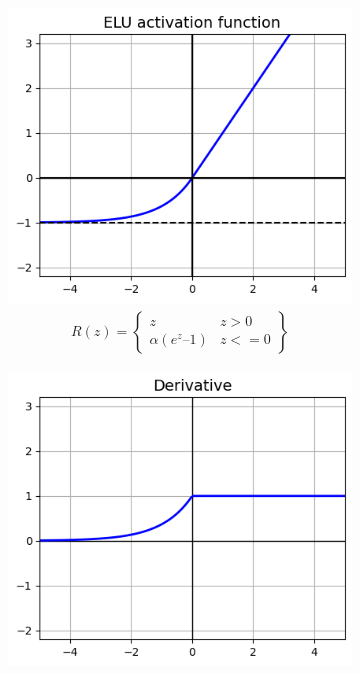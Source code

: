 \begin{figure}[H]
  \centering
  \begin{subfigure}{0.5\textwidth}
      \centering
      \includegraphics[width=0.9\linewidth]{fig/actfunc_elu.png}
      \caption{%
          \begin{equation}
              \begin{split}R(z) =
                  \begin{Bmatrix}
                      z                & z > 0  \\
                      \alpha (e^z – 1) & z <= 0
                  \end{Bmatrix}
              \end{split}
          \end{equation}
      }
      \label{fig:actfunc_elu}
  \end{subfigure}%
  \begin{subfigure}{0.5\textwidth}
      \centering
      \includegraphics[width=0.9\linewidth]{fig/actfunc_elu_der.png}

\end{subfigure}
\end{figure}
